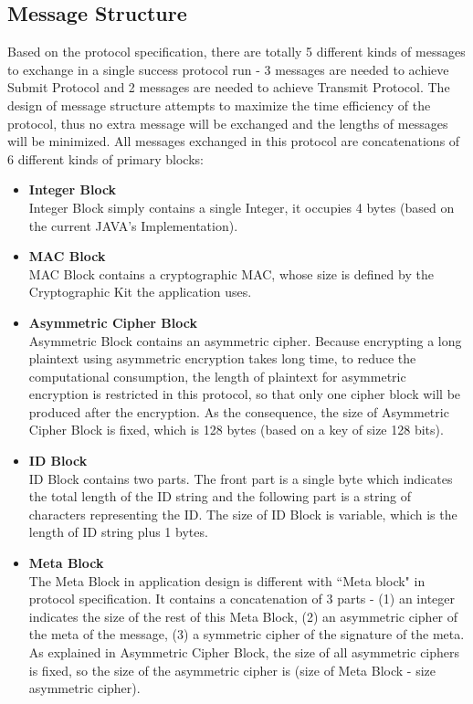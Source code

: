 \subsection{Message Structure}
Based on the protocol specification, there are totally 5 different kinds of messages to exchange in a single success protocol run - 3 messages are needed to achieve Submit Protocol and 2 messages are needed to achieve Transmit Protocol. The design of message structure attempts to maximize the time efficiency of the protocol, thus no extra message will be exchanged and the lengths of messages will be minimized. All messages exchanged in this protocol are concatenations of 6 different kinds of primary blocks:
\begin{itemize}
\item \textbf{Integer Block} \\
Integer Block simply contains a single Integer, it occupies 4 bytes (based on the current JAVA's Implementation).

\item \textbf{MAC Block} \\
MAC Block contains a cryptographic MAC, whose size is defined by the Cryptographic Kit the application uses.

\item \textbf{Asymmetric Cipher Block} \\
Asymmetric Block contains an asymmetric cipher. Because encrypting a long plaintext using asymmetric encryption takes long time, to reduce the computational consumption, the length of plaintext for asymmetric encryption is restricted in this protocol, so that only one cipher block will be produced after the encryption. As the consequence, the size of Asymmetric Cipher Block is fixed, which is 128 bytes (based on a key of size 128 bits).

\item \textbf{ID Block} \\
ID Block contains two parts. The front part is a single byte which indicates the total length of the ID string and the following part is a string of characters representing the ID. The size of ID Block is variable, which is the length of ID string plus 1 bytes.

\item \textbf{Meta Block} \\
The Meta Block in application design is different with ``Meta block" in protocol specification. It contains a concatenation of 3 parts - (1) an integer indicates the size of the rest of this Meta Block, (2) an asymmetric cipher of the meta of the message, (3) a symmetric cipher of the signature of the meta. As explained in Asymmetric Cipher Block, the size of all asymmetric ciphers is fixed, so the size of the asymmetric cipher is (size of Meta Block - size asymmetric cipher).


\end{itemize}
